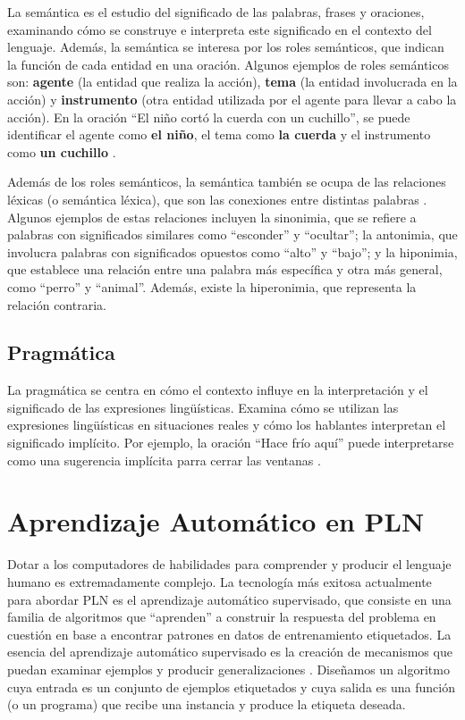 La semántica es el estudio del significado de las palabras, frases y oraciones, examinando cómo se construye e interpreta este significado en el contexto del lenguaje. Además, la semántica se interesa por los roles semánticos, que indican la función de cada entidad en una oración.  Algunos ejemplos de roles semánticos son: \textcolor[rgb]{0.00,0.00,1.00}{\textbf{agente}} (la entidad que realiza la acción), \textcolor[rgb]{1.00,0.00,0.00}{\textbf{tema}} (la entidad involucrada en la acción) y \textcolor[rgb]{0.00,1.00,0.00}{\textbf{instrumento}} (otra entidad utilizada por el agente para llevar a cabo la acción). En la oración ``El niño cortó la cuerda con un cuchillo'', se puede identificar el agente como \textcolor[rgb]{0.00,0.00,1.00}{\textbf{el niño}}, el tema como \textcolor[rgb]{1.00,0.00,0.00}{\textbf{la cuerda}} y el instrumento como \textcolor[rgb]{0.00,1.00,0.00}{\textbf{un cuchillo}} \cite{JohnsonMLSS}.

Además de los roles semánticos, la semántica también se ocupa de las relaciones léxicas (o semántica léxica), que son las conexiones entre distintas palabras \cite{yule2016study}. Algunos ejemplos de estas relaciones incluyen la sinonimia, que se refiere a palabras con significados similares como ``esconder'' y ``ocultar''; la antonimia, que involucra palabras con significados opuestos como ``alto'' y ``bajo''; y la hiponimia, que establece una relación entre una palabra más específica y otra más general, como ``perro'' y ``animal''. Además, existe la hiperonimia, que representa la relación contraria.

\subsection{Pragmática}

La pragmática se centra en cómo el contexto influye en la interpretación y el significado de las expresiones lingüísticas. Examina cómo se utilizan las expresiones lingüísticas en situaciones reales y cómo los hablantes interpretan el significado implícito. Por ejemplo, la oración ``Hace frío aquí'' puede interpretarse como una sugerencia implícita parra cerrar las ventanas \cite{fromkin2018introduction}.


\section{Aprendizaje Automático en PLN}

Dotar a los computadores de habilidades para comprender y producir el lenguaje humano es extremadamente complejo. La tecnología más exitosa actualmente para abordar PLN es el aprendizaje automático supervisado, que consiste en una familia de algoritmos que ``aprenden'' a construir la respuesta del problema en cuestión en base a encontrar patrones en datos de entrenamiento etiquetados. La esencia del aprendizaje automático supervisado es la creación de mecanismos que puedan examinar ejemplos y producir generalizaciones \cite{goldberg2017neural}. Diseñamos un algoritmo cuya entrada es un conjunto de ejemplos etiquetados y cuya salida es una función (o un programa) que recibe una instancia y produce la etiqueta deseada.

